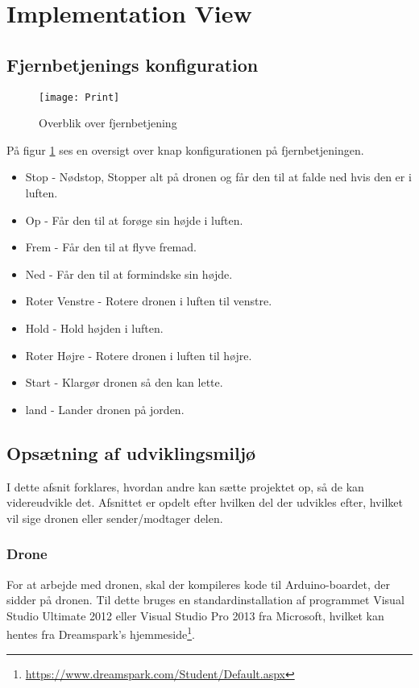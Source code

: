 \documentclass[Main]{subfiles}
\begin{document}
\section{Implementation View}
\subsection{Fjernbetjenings konfiguration}

\begin{figure}[H]
\centering
\texttt{[image: Print]}
\caption{Overblik over fjernbetjening}
\label{Fig:print}
\end{figure}

På figur \ref{Fig:print} ses en oversigt over knap konfigurationen på fjernbetjeningen. 

\begin{itemize}
\item Stop - Nødstop, Stopper alt på dronen og får den til at falde ned hvis den er i luften.
\item Op - Får den til at forøge sin højde i luften.
\item Frem - Får den til at flyve fremad.
\item Ned - Får den til at formindske sin højde.
\item Roter Venstre - Rotere dronen i luften til venstre.
\item Hold - Hold højden i luften.
\item Roter Højre - Rotere dronen i luften til højre.
\item Start - Klargør dronen så den kan lette.
\item land - Lander dronen på jorden.
\end{itemize}


\subsection{Opsætning af udviklingsmiljø}
I dette afsnit forklares, hvordan andre kan sætte projektet op, så de kan videreudvikle det.
Afsnittet er opdelt efter hvilken del der udvikles efter, hvilket vil sige dronen eller sender/modtager delen.

\subsubsection{Drone}\label{sec: Drone}
For at arbejde med dronen, skal der kompileres kode til Arduino-boardet, der sidder på dronen.
Til dette bruges en standardinstallation af programmet Visual Studio Ultimate 2012 eller Visual Studio Pro 2013 fra Microsoft, hvilket kan hentes fra Dreamspark's hjemmeside\footnote{\url{https://www.dreamspark.com/Student/Default.aspx}}.
\end{document}
